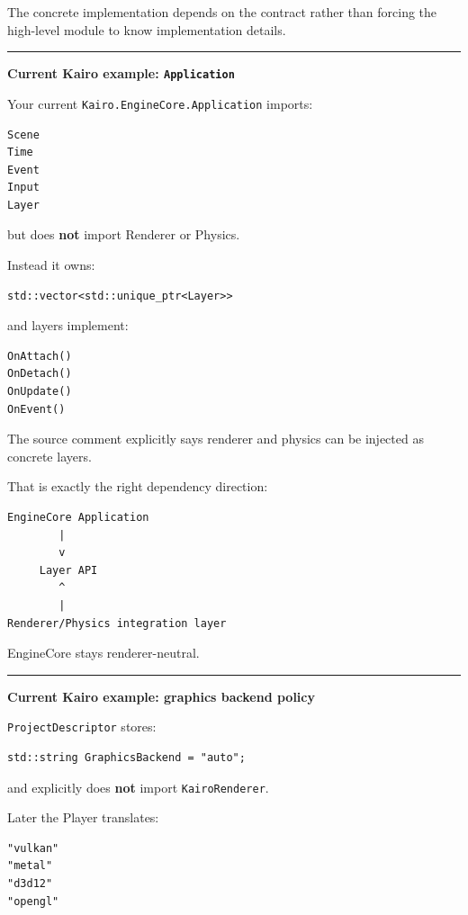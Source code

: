 The concrete implementation depends on the contract rather than forcing the high-level module to know implementation details.

\begin{center}\rule{0.5\linewidth}{0.5pt}\end{center}

\textbf{Current Kairo example: \texttt{Application}}

Your current \texttt{Kairo.EngineCore.Application} imports:

\begin{verbatim}
Scene
Time
Event
Input
Layer
\end{verbatim}

but does \textbf{not} import Renderer or Physics.

Instead it owns:

\begin{verbatim}
std::vector<std::unique_ptr<Layer>>
\end{verbatim}

and layers implement:

\begin{verbatim}
OnAttach()
OnDetach()
OnUpdate()
OnEvent()
\end{verbatim}

The source comment explicitly says renderer and physics can be injected as concrete layers.

That is exactly the right dependency direction:

\begin{verbatim}
EngineCore Application
        |
        v
     Layer API
        ^
        |
Renderer/Physics integration layer
\end{verbatim}

EngineCore stays renderer-neutral.

\begin{center}\rule{0.5\linewidth}{0.5pt}\end{center}

\textbf{Current Kairo example: graphics backend policy}

\texttt{ProjectDescriptor} stores:

\begin{verbatim}
std::string GraphicsBackend = "auto";
\end{verbatim}

and explicitly does \textbf{not} import \texttt{KairoRenderer}.

Later the Player translates:

\begin{verbatim}
"vulkan"
"metal"
"d3d12"
"opengl"
\end{verbatim}


